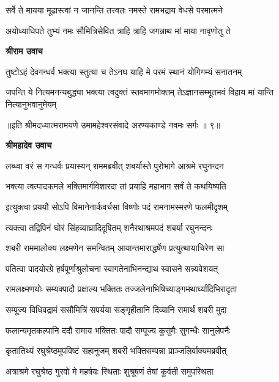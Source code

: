 \twolineshloka
{सर्वे ते मायया मूढास्त्वां न जानन्ति तत्त्वतः}
{नमस्ते रामभद्राय वेधसे परमात्मने} %

\twolineshloka
{अयोध्याधिपते तुभ्यं नमः सौमित्रिसेवित}
{त्राहि त्राहि जगन्नाथ मां माया नावृणोतु ते} %

\textbf{श्रीराम उवाच}

\twolineshloka
{तुष्टोऽहं देवगन्धर्व भक्त्या स्तुत्या च तेऽनघ}
{याहि मे परमं स्थानं योगिगम्यं सनातनम्} %

\fourlineindentedshloka
{जपन्ति ये नित्यमनन्यबुद्ध्या}
{भक्त्या त्वदुक्तं स्तवमागमोक्तम्}
{तेऽज्ञानसम्भूतभवं विहाय}
{मां यान्ति नित्यानुभवानुमेयम्} %

{॥इति श्रीमदध्यात्मरामयणे उमामहेश्वरसंवादे
अरण्यकाण्डे नवमः सर्गः ॥ ९॥
}




\textbf{श्रीमहादेव उवाच}

\twolineshloka
{लब्ध्वा वरं स गन्धर्वः प्रयास्यन् राममब्रवीत्}
{शबर्यास्ते पुरोभागे आश्रमे रघुनन्दन} %

\twolineshloka
{भक्त्या त्वत्पादकमले भक्तिमार्गविशारदा}
{तां प्रयाहि महाभाग सर्वं ते कथयिष्यति} %

\twolineshloka
{इत्युक्त्वा प्रययौ सोऽपि विमानेनार्कवर्चसा}
{विष्णोः पदं रामनामस्मरणे फलमीदृशम्} %

\twolineshloka
{त्यक्त्वा तद्विपिनं घोरं सिंहव्याघ्रादिदूषितम्}
{शनैरथाश्रमपदं शबर्या रघुनन्दनः} %

\twolineshloka
{शबरी राममालोक्य लक्ष्मणेन समन्वितम्}
{आयान्तमाराद्धर्षेण प्रत्युत्थायाचिरेण सा} %

\twolineshloka
{पतित्वा पादयोरग्रे हर्षपूर्णाश्रुलोचना}
{स्वागतेनाभिनन्द्याथ स्वासने सन्न्यवेशयत्} %

\twolineshloka
{रामलक्ष्मणयोः सम्यक्पादौ प्रक्षाल्य भक्तितः}
{तज्जलेनाभिषिच्याङ्गमथार्घ्यादिभिरादृता} %

\twolineshloka
{सम्पूज्य विधिवद्रामं ससौमित्रिं सपर्यया}
{सङ्गृहीतानि दिव्यानि रामार्थं शबरी मुदा} %

\twolineshloka
{फलान्यमृतकल्पानि ददौ रामाय भक्तितः}
{पादौ सम्पूज्य कुसुमैः सुगन्धैः सानुलेपनैः} %

\twolineshloka
{कृतातिथ्यं रघुश्रेष्ठमुपविष्टं सहानुजम्}
{शबरी भक्तिसम्पन्ना प्राञ्जलिर्वाक्यमब्रवीत्} %

\twolineshloka
{अत्राश्रमे रघुश्रेष्ठ गुरवो मे महर्षयः}
{स्थिताः शुश्रूषणं तेषां कुर्वती समुपस्थिता} %

